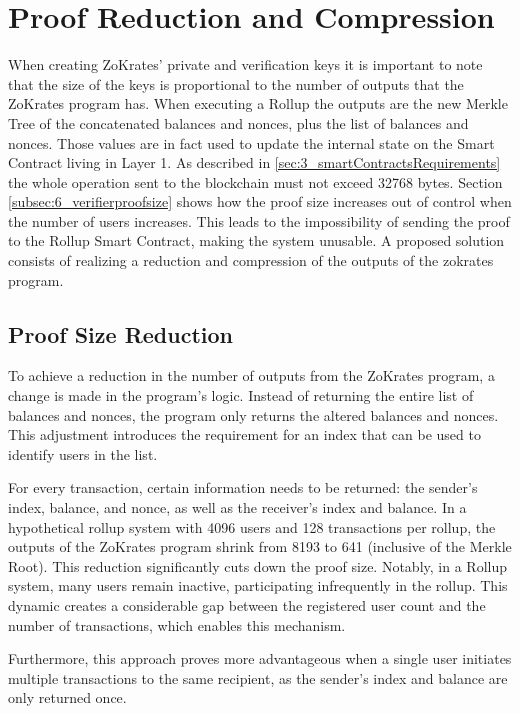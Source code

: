 \section{Proof Reduction and Compression}
When creating ZoKrates' private and verification keys it is important to note that the size of the keys is proportional to the number of outputs that the ZoKrates program has. When executing a Rollup the outputs are the new Merkle Tree of the concatenated balances and nonces, plus the list of balances and nonces. Those values are in fact used to update the internal state on the Smart Contract living in Layer 1. As described in \ref{sec:3_smartContractsRequirements} the whole operation sent to the blockchain must not exceed 32768 bytes. Section \ref{subsec:6_verifierproofsize} shows how the proof size increases out of control when the number of users increases. This leads to the impossibility of sending the proof to the Rollup Smart Contract, making the system unusable. A proposed solution consists of realizing a reduction and compression of the outputs of the zokrates program.

\subsection{Proof Size Reduction}

To achieve a reduction in the number of outputs from the ZoKrates program, a change is made in the program's logic. Instead of returning the entire list of balances and nonces, the program only returns the altered balances and nonces. This adjustment introduces the requirement for an index that can be used to identify users in the list.

For every transaction, certain information needs to be returned: the sender's index, balance, and nonce, as well as the receiver's index and balance. In a hypothetical rollup system with 4096 users and 128 transactions per rollup, the outputs of the ZoKrates program shrink from 8193 to 641 (inclusive of the Merkle Root). This reduction significantly cuts down the proof size. Notably, in a Rollup system, many users remain inactive, participating infrequently in the rollup. This dynamic creates a considerable gap between the registered user count and the number of transactions, which enables this mechanism.

Furthermore, this approach proves more advantageous when a single user initiates multiple transactions to the same recipient, as the sender's index and balance are only returned once.

